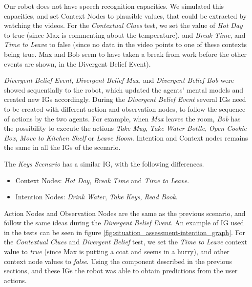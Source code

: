 Our robot does not have speech recognition capacities. We simulated this capacities, and set Context Nodes to plausible values, that could be extracted by watching the videos. For the \textit{Contextual Clues} test, we set the value of \textit{Hot Day} to true (since Max is commenting about the temperature), and \textit{Break Time}, and \textit{Time to Leave} to false (since no data in the video points to one of these contexts being true. Max and Bob seem to have taken a break from work before the other events are shown, in the Divergent Belief Event).

\textit{Divergent Belief Event}, \textit{Divergent Belief Max}, and \textit{Divergent Belief Bob} were showed sequentially to the robot, which updated the agents' mental models and created new IGs accordingly. During the \textit{Divergent Belief Event} several IGs need to be created with different action and observation nodes, to follow the sequence of actions by the two agents. For example, when \textit{Max} leaves the room, \textit{Bob} has the possibility to execute the actions \textit{Take Mug}, \textit{Take Water Bottle}, \textit{Open Cookie Box}, \textit{Move to Kitchen Shelf} or \textit{Leave Room}. Intention and Context nodes remains the same in all the IGs of the scenario.


The \textit{Keys Scenario} has a similar IG, with the following differences.
\begin{itemize}
\item Context Nodes: \textit{Hot Day}, \textit{Break Time} and \textit{Time to Leave}.
\item Intention Nodes: \textit{Drink Water}, \textit{Take Keys}, \textit{Read Book}.
\end{itemize}

Action Nodes and Observation Nodes are the same as the previous scenario, and follow the same ideas during the \textit{Divergent Belief Event}. An example of IG used in the tests can be seen in figure \ref{fig:situation_assessment-intention_graph}. For the \textit{Contextual Clues} and \textit{Divergent Belief} test, we set the \textit{Time to Leave} context value to \textit{true} (since Max is putting a coat and seems in a hurry), and other context node values to \textit{false}. Using the component described in the previous sections, and these IGs the robot was able to obtain predictions from the user actions.

